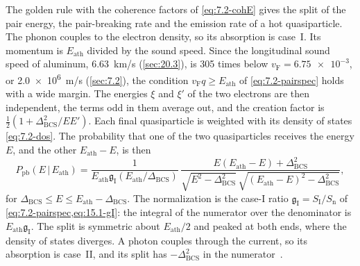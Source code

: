 The golden rule with the coherence factors of \cref{eq:7.2-cohE} gives the split of the pair energy, the pair-breaking rate and the emission rate of a hot quasiparticle. The phonon couples to the electron density, so its absorption is case~I. Its momentum is $E_{\mathrm{ath}}$ divided by the sound speed. Since the longitudinal sound speed of aluminum, \SI{6.63}{km/s} (\cref{sec:20.3}), is 305 times below $v_{\mathrm{F}} = \num{6.75e-3}$, or \SI{2.0e6}{m/s} (\cref{sec:7.2}), the condition $v_{\mathrm{F}}q \ge E_{\mathrm{ath}}$ of \cref{eq:7.2-pairspec} holds with a wide margin. The energies $\xi$ and $\xi'$ of the two electrons are then independent, the terms odd in them average out, and the creation factor is $\frac12(1 + \Delta_{\mathrm{BCS}}^2/EE')$. Each final quasiparticle is weighted with its density of states \cref{eq:7.2-dos}. The probability that one of the two quasiparticles receives the energy $E$, and the other $E_{\mathrm{ath}} - E$, is then
\begin{equation}
  P_{\mathrm{pb}}(E\,|\,E_{\mathrm{ath}}) = \frac{1}{E_{\mathrm{ath}}\mathfrak{g}_{\mathrm{I}}(E_{\mathrm{ath}}/\Delta_{\mathrm{BCS}})}\,
  \frac{E(E_{\mathrm{ath}} - E) + \Delta_{\mathrm{BCS}}^2}{\sqrt{E^2 - \Delta_{\mathrm{BCS}}^2}\,\sqrt{(E_{\mathrm{ath}} - E)^2 - \Delta_{\mathrm{BCS}}^2}} ,
  \label{eq:20.4-split}
\end{equation}
for $\Delta_{\mathrm{BCS}} \le E \le E_{\mathrm{ath}} - \Delta_{\mathrm{BCS}}$. The normalization is the case-I ratio $\mathfrak{g}_{\mathrm{I}} = S_{\mathrm{I}}/S_{\mathrm{n}}$ of \cref{eq:7.2-pairspec,eq:15.1-gI}: the integral of the numerator over the denominator is $E_{\mathrm{ath}}\mathfrak{g}_{\mathrm{I}}$. The split is symmetric about $E_{\mathrm{ath}}/2$ and peaked at both ends, where the density of states diverges. A photon couples through the current, so its absorption is case~II, and its split has $-\Delta_{\mathrm{BCS}}^2$ in the numerator~\cite[Eq.~(1)]{guruswamy2014quasiparticle}.

